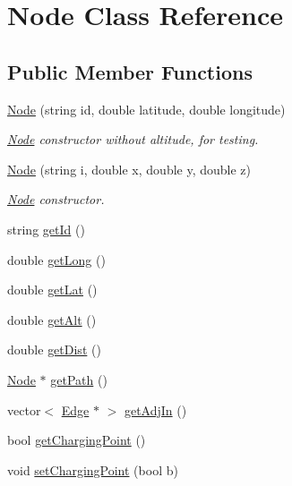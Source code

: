\hypertarget{class_node}{}\section{Node Class Reference}
\label{class_node}
\subsection*{Public Member Functions}
\begin{DoxyCompactItemize}
\item 
\mbox{\hyperlink{class_node_a28aac6e6241c57bb09bb8eced2b3694d}{Node}} (string id, double latitude, double longitude)
\begin{DoxyCompactList}\small\item\em \mbox{\hyperlink{class_node}{Node}} constructor without altitude, for testing. \end{DoxyCompactList}\item 
\mbox{\hyperlink{class_node_aec64c06bee93948a1ebfd6597982e578}{Node}} (string i, double x, double y, double z)
\begin{DoxyCompactList}\small\item\em \mbox{\hyperlink{class_node}{Node}} constructor. \end{DoxyCompactList}\item 
string \mbox{\hyperlink{class_node_ad560e18143071e5c5b8eb33d03870e00}{get\+Id}} ()
\item 
double \mbox{\hyperlink{class_node_a8c7aa3ca64970417959b88e0cd097aa2}{get\+Long}} ()
\item 
double \mbox{\hyperlink{class_node_abad0b37954e52e81581ee1a6055425ce}{get\+Lat}} ()
\item 
double \mbox{\hyperlink{class_node_ad772b7e55055f1d8d3ae2a7d99b63d72}{get\+Alt}} ()
\item 
double \mbox{\hyperlink{class_node_a57980950fdbe58cb696b10f387133474}{get\+Dist}} ()
\item 
\mbox{\hyperlink{class_node}{Node}} $\ast$ \mbox{\hyperlink{class_node_a419e5f9cbdea4b8f285d6dd841b92a2d}{get\+Path}} ()
\item 
vector$<$ \mbox{\hyperlink{class_edge}{Edge}} $\ast$ $>$ \mbox{\hyperlink{class_node_a3f01ccf70c3cf5b1df6fc0c560bfe5ef}{get\+Adj\+In}} ()
\item 
bool \mbox{\hyperlink{class_node_ae207a54fd98dc3ad4369f85530de4529}{get\+Charging\+Point}} ()
\item 
void \mbox{\hyperlink{class_node_ad802c1308c34e4acd51938cf2d85eee8}{set\+Charging\+Point}} (bool b)

\end{DoxyCompactItemize}

